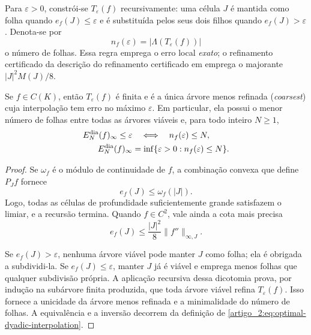 Para $\varepsilon>0$, constrói-se $T_\varepsilon(f)$ recursivamente: uma célula
$J$ é mantida como folha quando $e_f(J)\le\varepsilon$ e é substituída pelos
seus dois filhos quando $e_f(J)>\varepsilon$. Denota-se por
\begin{equation}
 n_f(\varepsilon)=|\Lambda(T_\varepsilon(f))|
 \label{artigo_2:eq:threshold-count}
\end{equation}
o número de folhas. Essa regra emprega o erro local \emph{exato}; o refinamento
certificado da descrição do refinamento certificado em \citet{artigo_2-oliveiraI} emprega o majorante $|J|^2M(J)/8$.

\begin{theorem}\label{map:artigo_2:11.1}
\label{artigo_2:thm:threshold-optimality}
Se $f\in C(K)$, então $T_\varepsilon(f)$ é finita e é a única árvore
menos refinada (\emph{coarsest}) cuja interpolação tem erro no máximo $\varepsilon$. Em particular,
ela possui o menor número de folhas entre todas as árvores viáveis e, para todo inteiro $N\ge1$,
\begin{equation}
 \begin{aligned}
 E_N^{\rm dia}(f)_\infty\le\varepsilon
 &\quad\Longleftrightarrow\quad n_f(\varepsilon)\le N,\\
 E_N^{\rm dia}(f)_\infty
 &=\inf\{\varepsilon>0:n_f(\varepsilon)\le N\}.
 \end{aligned}
 \label{artigo_2:eq:threshold-inversion}
\end{equation}
\end{theorem}

\begin{proof}
Se $\omega_f$ é o módulo de continuidade de $f$, a combinação convexa que
define $P_Jf$ fornece
\[
 e_f(J)\le\omega_f(|J|).
\]
Logo, todas as células de profundidade suficientemente grande satisfazem o
limiar, e a recursão termina. Quando $f\in C^2$, vale ainda a cota mais
precisa
\begin{equation}
 e_f(J)\le \frac{|J|^2}{8}\|f''\|_{\infty,J}.
 \label{artigo_2:eq:local-upper-basic}
\end{equation}

Se $e_f(J)>\varepsilon$, nenhuma árvore viável pode manter $J$ como folha;
ela é obrigada a subdividi-la. Se $e_f(J)\le\varepsilon$, manter $J$ já é
viável e emprega menos folhas que qualquer subdivisão própria. A aplicação recursiva dessa
dicotomia prova, por indução na subárvore finita produzida,
que toda árvore viável refina $T_\varepsilon(f)$. Isso fornece a unicidade da árvore menos
refinada e a minimalidade do número de folhas. A equivalência e a inversão decorrem da
definição de \eqref{artigo_2:eq:optimal-dyadic-interpolation}.
\end{proof}

